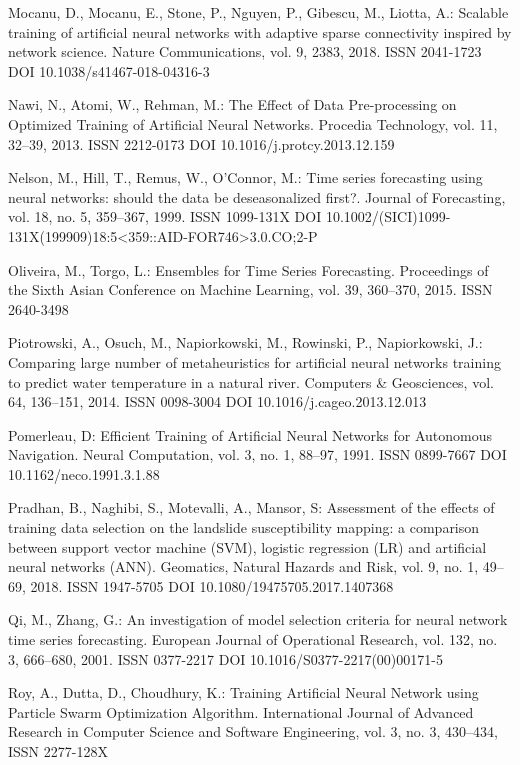 \begin{thebibliography}{99.}
 Mocanu, D., Mocanu, E., Stone, P., Nguyen, P., Gibescu, M., Liotta, A.: Scalable training of artificial neural networks with adaptive sparse connectivity inspired by network science. Nature Communications, vol. 9, 2383, 2018. ISSN 2041-1723 DOI 10.1038/s41467-018-04316-3

 Nawi, N., Atomi, W., Rehman, M.: The Effect of Data Pre-processing on Optimized Training of Artificial Neural Networks. Procedia Technology, vol. 11, 32--39, 2013. ISSN 2212-0173 DOI 10.1016/j.protcy.2013.12.159

 Nelson, M., Hill, T., Remus, W., O'Connor, M.: Time series forecasting using neural networks: should the data be deseasonalized first?. Journal of Forecasting, vol. 18, no. 5, 359--367, 1999. ISSN 1099-131X DOI 10.1002/(SICI)1099-131X(199909)18:5<359::AID-FOR746>3.0.CO;2-P

 Oliveira, M., Torgo, L.: Ensembles for Time Series Forecasting. Proceedings of the Sixth Asian Conference on Machine Learning, vol. 39, 360--370, 2015. ISSN 2640-3498

 Piotrowski, A., Osuch, M., Napiorkowski, M., Rowinski, P., Napiorkowski, J.: Comparing large number of metaheuristics for artificial neural networks training to predict water temperature in a natural river. Computers \& Geosciences, vol. 64, 136--151, 2014. ISSN 0098-3004 DOI 10.1016/j.cageo.2013.12.013

 Pomerleau, D: Efficient Training of Artificial Neural Networks for Autonomous Navigation. Neural Computation, vol. 3, no. 1, 88--97, 1991. ISSN 0899-7667 DOI 10.1162/neco.1991.3.1.88

 Pradhan, B., Naghibi, S., Motevalli, A., Mansor, S: Assessment of the effects of training data selection on the landslide susceptibility mapping: a comparison between support vector machine (SVM), logistic regression (LR) and artificial neural networks (ANN). Geomatics, Natural Hazards and Risk, vol. 9, no. 1, 49--69, 2018. ISSN 1947-5705 DOI 10.1080/19475705.2017.1407368

 Qi, M., Zhang, G.: An investigation of model selection criteria for neural network time series forecasting. European Journal of Operational Research, vol. 132, no. 3, 666--680, 2001. ISSN 0377-2217 DOI 10.1016/S0377-2217(00)00171-5

 Roy, A., Dutta, D., Choudhury, K.: Training Artificial Neural Network using Particle Swarm Optimization Algorithm. International Journal of Advanced Research in Computer Science and Software Engineering, vol. 3, no. 3, 430--434, ISSN 2277-128X


\end{thebibliography}
